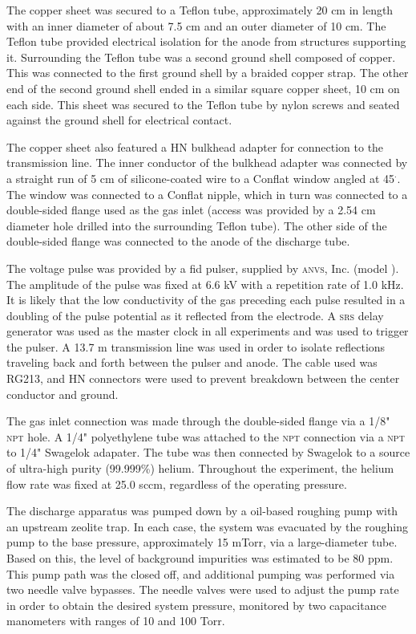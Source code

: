 The copper sheet was secured to a Teflon tube, approximately 20 cm in length
with an inner diameter of about 7.5 cm and an outer diameter of 10 cm. The
Teflon tube provided electrical isolation for the anode from structures
supporting it. Surrounding the Teflon tube was a second ground shell composed of
copper. This was connected to the first ground shell by a braided copper strap.
The other end of the second ground shell ended in a similar square copper sheet,
10 cm on each side. This sheet was secured to the Teflon tube by nylon screws
and seated against the ground shell for electrical contact.

The copper sheet also featured a HN bulkhead adapter for connection to the
transmission line. The inner conductor of the bulkhead adapter was connected by
a straight run of 5 cm of silicone-coated wire to a Conflat window angled at
45$^\cdot$. The window was connected to a Conflat nipple, which in turn was
connected to a double-sided flange used as the gas inlet (access was provided by
a 2.54 cm diameter hole drilled into the surrounding Teflon tube). The other
side of the double-sided flange was connected to the anode of the discharge
tube.

The voltage pulse was provided by a \acs{fid} pulser, supplied by \textsc{anvs},
Inc. (model ). The amplitude of the pulse was fixed at 6.6 kV
with a repetition rate of 1.0 kHz. It is likely that the low conductivity of the
gas preceding each pulse resulted in a doubling of the pulse potential as it
reflected from the electrode. A \textsc{srs}  delay generator was
used as the master clock in all experiments and was used to trigger the pulser.
A 13.7 m transmission line was used in order to isolate reflections traveling
back and forth between the pulser and anode. The cable used was RG213, and HN
connectors were used to prevent breakdown between the center conductor and
ground.

The gas inlet connection was made through the double-sided flange via a 1/8"
\textsc{npt} hole. A 1/4" polyethylene tube was attached to the \textsc{npt}
connection via a \textsc{npt} to 1/4" Swagelok adapater. The tube was then
connected by Swagelok to a source of ultra-high purity (99.999\%) helium.
Throughout the experiment, the helium flow rate was fixed at 25.0 sccm,
regardless of the operating pressure.

The discharge apparatus was pumped down by a oil-based roughing pump with an
upstream zeolite trap. In each case, the system was evacuated by the roughing
pump to the base pressure, approximately 15 mTorr, via a large-diameter tube.
Based on this, the level of background impurities was estimated to be 80 ppm.
This pump path was the closed off, and additional pumping was performed via two
needle valve bypasses. The needle valves were used to adjust the pump rate in
order to obtain the desired system pressure, monitored by two capacitance
manometers with ranges of 10 and 100 Torr.

